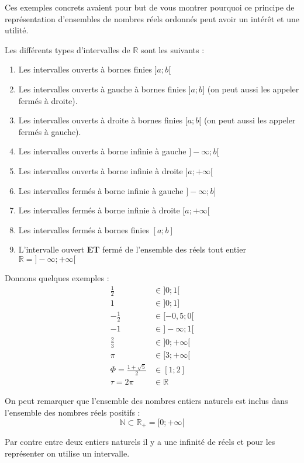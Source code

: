 \documentclass[11pt]{article}
\begin{document}
Ces exemples concrets avaient pour but de vous montrer pourquoi ce
principe de représentation d'ensembles de nombres réels ordonnés
peut avoir un intérêt et une utilité.

Les différents types d'intervalles de \(\mathbb{R}\) sont les
suivants :
\begin{enumerate}
\item Les intervalles ouverts à bornes finies \(]a ; b[\)
\item Les intervalles ouverts à gauche à bornes finies \(]a ; b]\) (on
peut aussi les appeler fermés à droite).
\item Les intervalles ouverts à droite à bornes finies \([a ; b[\) (on
peut aussi les appeler fermés à gauche).
\item Les intervalles ouverts à borne infinie à gauche \(]-\infty ; b[\)
\item Les intervalles ouverts à borne infinie à droite \(]a ; +\infty[\)
\item Les intervalles fermés à borne infinie à gauche \(]-\infty ; b]\)
\item Les intervalles fermés à borne infinie à droite \([a ; +\infty[\)
\item Les intervalles fermés à bornes finies \([a ; b]\)
\item L'intervalle ouvert \textbf{ET} fermé de l'ensemble des réels tout
entier \(\mathbb{R} = ]-\infty ; +\infty[\)
\end{enumerate}

Donnons quelques exemples :
\begin{align}
\frac{1}{2} &\in ]0 ; 1[ \\
1 &\in ]0 ; 1] \\
-\frac{1}{2} &\in [-0,5 ; 0[\\
-1 &\in ]-\infty ; 1[\\
\frac{2}{3} &\in ]0 ; +\infty[ \\
\pi &\in [3 ; +\infty[ \\
\Phi = \frac{1 + \sqrt{5}}{2} &\in [1 ; 2] \\
\tau = 2\pi &\in \mathbb{R}
\end{align}

On peut remarquer que l'ensemble des nombres entiers naturels est
inclus dans l'ensemble des nombres réels positifs :
\[\mathbb{N}\subset \mathbb{R}_{+} = [0; +\infty[\]

Par contre entre deux entiers naturels il y a une infinité de réels
et pour les représenter on utilise un intervalle.
\end{document}
